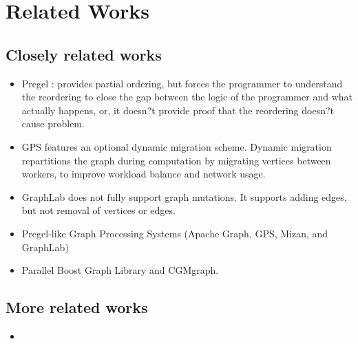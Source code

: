 \section{Related Works}
\subsection{Closely related works}
\begin{frame}
\begin{itemize}
  \item Pregel : provides partial ordering, but forces the programmer to understand the reordering to close the gap between the logic of the programmer and what actually happens, or, it doesn?t provide proof that the reordering doesn?t cause problem.
  \item GPS features an optional dynamic migration scheme. Dynamic migration repartitions the graph during computation by migrating vertices between workers, to improve workload balance and network usage. 
  \item GraphLab does not fully support graph mutations. It supports adding edges, but not removal of vertices or edges.
  \item Pregel-like Graph Processing Systems (Apache Graph, GPS, Mizan, and GraphLab) 
  \item Parallel Boost Graph Library and CGMgraph. 
  \end{itemize}
\end{frame}

\subsection{More related works}
\begin{frame}
\begin{itemize}
  \item 
  \end{itemize}
\end{frame}
